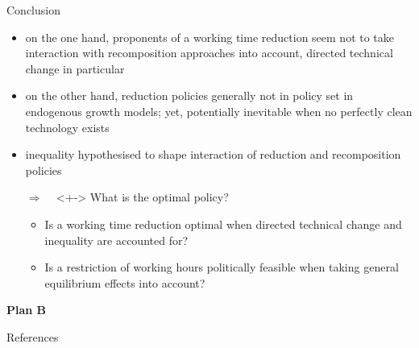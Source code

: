 \documentclass[11pt,aspectratio=169]{beamer}
\newcommand{\ar}{$\Rightarrow$ \ }
\begin{document}
\begin{frame}{Conclusion}
	\pause
	\vspace{-7mm}
	\vspace{-2mm}
\begin{itemize}
\item<+-> on the one hand, proponents of a working time reduction seem not to take interaction with recomposition approaches into account, directed technical change in particular
\item<+-> on the other hand, reduction policies generally not in policy set in endogenous growth models; yet, potentially inevitable when no perfectly clean technology exists
\item<+-> inequality hypothesised to shape interaction of reduction and recomposition policies
\vspace{2mm}
\item[\ar]<+-> What is the optimal policy?
\begin{itemize}
\item<+-> Is a working time reduction optimal when directed technical change and inequality are accounted for?
\item<+-> Is a restriction of working hours politically feasible when taking general equilibrium effects into account?
\end{itemize}
\end{itemize}
\pause
\vspace{-2mm}
\textbf{Plan B}
\end{frame}

\begingroup
\addtocounter{framenumber}{-4}
\begin{frame}[allowframebreaks]{References}
	
	
	
\end{frame}
\endgroup
\end{document}
